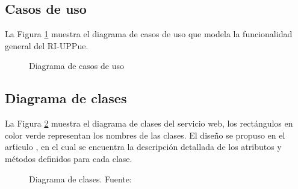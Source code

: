 \subsection{Casos de uso}

La Figura \ref{casoUso1} muestra el diagrama de casos de uso que modela la funcionalidad general del RI-UPPue.

\begin{figure}[!ht]
	\centering
    \caption{Diagrama de casos de uso} %
    \label{casoUso1}
\end{figure}

\subsection{Diagrama de clases}

La Figura \ref{diagramaClases1} muestra el diagrama de clases del servicio web, los rect\'angulos en color verde representan los nombres de las clases. El dise\~{n}o se propuso en el ar\'ticulo \cite{SOMIdiseno}, en el cual se encuentra la descripci\'on detallada de los atributos y m\'etodos definidos para cada clase.

\begin{figure}[!ht]
	\centering
    \caption{Diagrama de clases. Fuente: \cite{SOMIdiseno}} %
    \label{diagramaClases1}
\end{figure}

